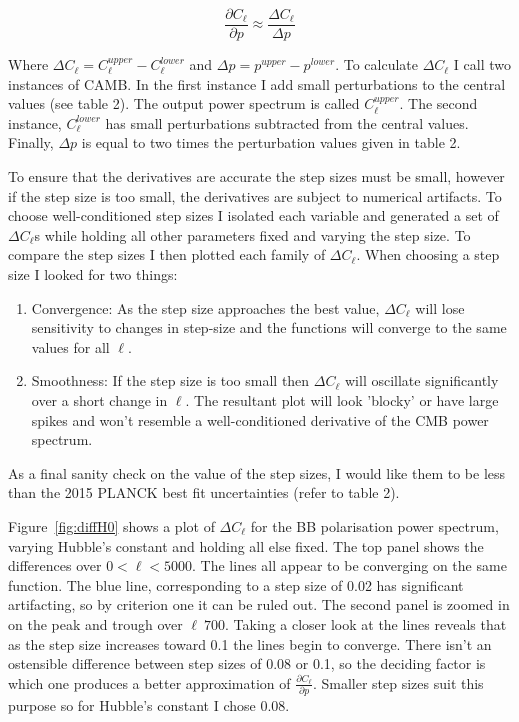 \begin{equation}
\label{eqn:dcl}
\frac{\partial C_{\ell}}{\partial p} \approx \frac{\Delta C_{\ell}}{\Delta p}
\end{equation}
 
Where $\Delta C_{\ell} = C^{upper}_{\ell} - C^{lower}_{\ell}$ and $\Delta p = p^{upper} - p^{lower}$. To calculate $\Delta C_{\ell}$ I call two instances of CAMB. In the first instance I add small perturbations to the central values (see table 2). The output power spectrum is called $C^{upper}_{\ell}$. The second instance, $C^{lower}_{\ell}$ has small perturbations subtracted from the central values. Finally, $\Delta p$ is equal to two times the perturbation values given in table 2.

To ensure that the derivatives are accurate the step sizes must be small, however if the step size is too small, the derivatives are subject to numerical artifacts. To choose well-conditioned step sizes I isolated each variable and generated a set of $\Delta C_{\ell}$s while holding all other parameters fixed and varying the step size. To compare the step sizes I then plotted each family of $\Delta C_{\ell}$. When choosing a step size I looked for two things:

\begin{enumerate}
\item Convergence: As the step size approaches the best value, $\Delta C_{\ell}$ will lose sensitivity to changes in step-size and the functions will converge to the same values for all $\ell$.

\item Smoothness: If the step size is too small then $\Delta C_{\ell}$ will oscillate significantly over a short change in $\ell$. The resultant plot will look 'blocky' or have large spikes and won't resemble a well-conditioned derivative of the CMB power spectrum.
\end{enumerate}

As a final sanity check on the value of the step sizes, I would like them to be less than the 2015 PLANCK best fit uncertainties (refer to table 2).
 
Figure~\ref{fig:diffH0} shows a plot of $\Delta C_{\ell}$ for the BB polarisation power spectrum, varying Hubble's constant and holding all else fixed. The top panel shows the differences over $ 0 < \ell < 5000$. The lines all appear to be converging on the same function. The blue line, corresponding to a step size of 0.02 has significant artifacting, so by criterion one it can be ruled out. The second panel is zoomed in on the peak and trough over $\ell ~ 700$. Taking a closer look at the lines reveals that as the step size increases toward 0.1 the lines begin to converge. There isn't an ostensible difference between step sizes of 0.08 or 0.1, so the deciding factor is which one produces a better approximation of $\frac{\partial C_{\ell}}{\partial p}$. Smaller step sizes suit this purpose so for Hubble's constant I chose 0.08.
  
